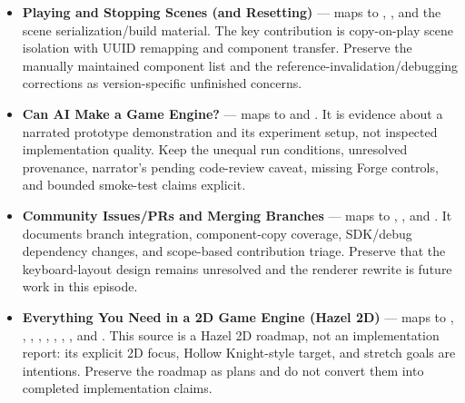 \begin{itemize}
\item
  \textbf{Playing and Stopping Scenes (and Resetting)} --- maps to , , and the scene serialization/build material. The key contribution is copy-on-play scene isolation with UUID remapping and component transfer. Preserve the manually maintained component list and the reference-invalidation/debugging corrections as version-specific unfinished concerns.
\item
  \textbf{Can AI Make a Game Engine?} --- maps to  and . It is evidence about a narrated prototype demonstration and its experiment setup, not inspected implementation quality. Keep the unequal run conditions, unresolved provenance, narrator's pending code-review caveat, missing Forge controls, and bounded smoke-test claims explicit.
\item
  \textbf{Community Issues/PRs and Merging Branches} --- maps to , , and . It documents branch integration, component-copy coverage, SDK/debug dependency changes, and scope-based contribution triage. Preserve that the keyboard-layout design remains unresolved and the renderer rewrite is future work in this episode.
\item
  \textbf{Everything You Need in a 2D Game Engine (Hazel 2D)} --- maps to , , , , , , , , and . This source is a Hazel 2D roadmap, not an implementation report: its explicit 2D focus, Hollow Knight-style target, and stretch goals are intentions. Preserve the roadmap as plans and do not convert them into completed implementation claims.

\end{itemize}
